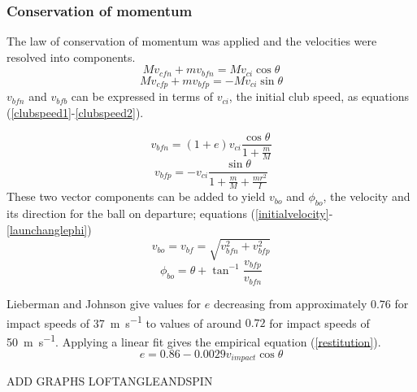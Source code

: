 \documentclass[12pt]{article}
\begin{document}
\subsubsection{Conservation of momentum}
The law of conservation of momentum was applied and the velocities were resolved into components.
\begin{equation} \label{linearmomentum1}
M v_{cfn}+mv_{bfn}=Mv_{ci} \cos{\theta}
\end{equation}
\begin{equation} \label{linearmomentum2}
M v_{cfp}+mv_{bfp}=-Mv_{ci} \sin{\theta}
\end{equation}
$v_{bfn}$ and $v_{bfb}$ can be expressed in terms of $v_{ci}$, the initial club speed, as equations (\ref{clubspeed1}-\ref{clubspeed2}).

\begin{equation} \label{clubspeed1}
v_{bfn}=(1+e)v_{ci} \frac{\cos{\theta}}{1+\frac{m}{M}}
\end{equation}
\begin{equation} \label{clubspeed2}
v_{bfp}=-v_{ci} \frac{\sin{\theta}}{1+\frac{m}{M}+\frac{mr^2}{I}}
\end{equation}
These two vector components can be added to yield $v_{bo}$ and $\phi_{bo}$, the velocity and its direction for the ball on departure; equations (\ref{initialvelocity}-\ref{launchanglephi})\cite{Penner2001}
\begin{equation} \label{initialvelocity}
v_{bo}=v_{bf}=\sqrt{v_{bfn}^2+v_{bfp}^2}
\end{equation}
\begin{equation} \label{launchanglephi}
\phi_{bo}=\theta+\tan^{-1}{\frac{v_{bfp}}{v_{bfn}}}
\end{equation}

Lieberman and Johnson give values for $e$ decreasing from approximately $0.76$ for impact speeds of \SI{37}{\metre\per\second} to values of around $0.72$ for impact speeds of \SI{50}{\metre\per\second}. Applying a linear fit gives the empirical equation (\ref{restitution})\cite{Penner2001}.
\begin{equation} \label{restitution}
e=0.86-0.0029 v_{impact} \cos{\theta}
\end{equation}


ADD GRAPHS LOFTANGLEANDSPIN
\end{document}
